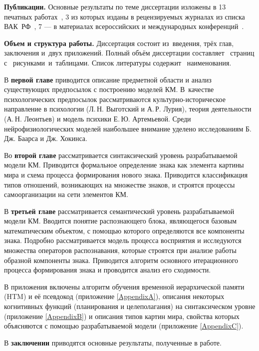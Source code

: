 \textbf{Публикации.} Основные результаты по теме диссертации изложены в 13 печатных работах~\cite{PanovA2011,PanovA2012a,PanovA2012b,PanovA2012c,PanovA2013b,PanovA2014a,PanovT2010b,PanovT2012a,PanovT2012b,PanovT2013,PanovT2014a,PanovT2014b,PanovA2014c,PanovAE2014a}, 3 из которых изданы в рецензируемых журналах из списка ВАК~РФ~\cite{PanovA2012c,PanovA2013b,PanovA2014a}, 7 --- в материалах всероссийских и международных конференций~\cite{PanovA2011,PanovA2012a,PanovA2012b,PanovT2010b,PanovT2012b,PanovT2014a,PanovT2014b}.

\textbf{Объем и структура работы.} Диссертация состоит из~введения, трёх глав, заключения и~двух приложений. Полный объём диссертации составляет \totalpages\ страниц с \totalfigures\ рисунками\iftotaltables\ и\totaltables\ таблицами\fi. Список литературы содержит \totalcitnums\ наименования.

В \textbf{первой главе} приводится описание предметной области и анализ существующих предпосылок с построению моделей КМ. В~качестве психологических предпосылок рассматриваются культурно-историческое направление в психологии (Л.\,Н. Выготский и А.\,Р. Лурия), теория деятельности (А.\,Н. Леонтьев) и модель психики Е.\,Ю. Артемьевой. Среди нейрофизиологических моделей наибольшее внимание уделено исследованиям Б.\,Дж. Баарса и Дж. Хокинса.

Во \textbf{второй главе} рассматривается синтаксический уровень разрабатываемой модели КМ. Приводится формальное определение знака как элемента картины мира и схема процесса формирования нового знака. Приводится классификация типов отношений, возникающих на множестве знаков, и строятся процессы самоорганизации на сети элементов КМ.

В \textbf{третьей главе} рассматривается семантический уровень разрабатываемой модели КМ. Вводится понятие распознающего блока, являющегося базовым математическим объектом, с помощью которого определяются все компоненты знака. Подробно рассматривается модель процесса восприятия и исследуются множества операторов распознавания, которые строятся при анализе работы образной компоненты знака. Приводится алгоритм основного итерационного процесса формирования знака и проводится анализ его сходимости.

В приложения включены алгоритм обучения временной иерархической памяти (HTM) и её псевдокод (приложение \ref{AppendixA}), описания некоторых когнитивных функций (планирования и целеполагания) на синтаксическом уровне (приложение \ref{AppendixB}) и описания типов картин мира, свойства которых объясняются с помощью разрабатываемой модели (приложение \ref{AppendixC}).

В \textbf{заключении} приводятся основные результаты, полученные в работе.
\clearpage